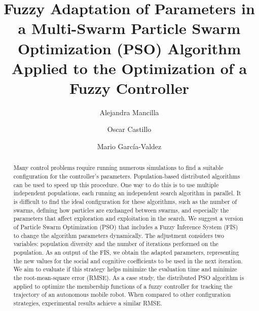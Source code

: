 \documentclass[runningheads]{llncs}
\begin{document}
%
\title{Fuzzy Adaptation of Parameters in a Multi-Swarm Particle Swarm Optimization (PSO) Algorithm Applied to the Optimization of a Fuzzy Controller } 

%
%
\author{Alejandra Mancilla \and
Oscar Castillo \and
Mario García-Valdez}
%
%

%
\maketitle              %
%
\begin{abstract}

     Many control problems require running numerous simulations to find a suitable configuration for the controller's parameters. Population-based distributed algorithms can be used to speed up this procedure. One way to do this is to use multiple independent populations, each running an independent search algorithm in parallel. It is difficult to find the ideal configuration for these algorithms, such as the number of swarms, defining how particles are exchanged between swarms, and especially the parameters that affect exploration and exploitation in the search. We suggest a version of Particle Swarm Optimization (PSO) that includes a Fuzzy Inference System (FIS) to change the algorithm parameters dynamically. The adjustment considers two variables: population diversity and the number of iterations performed on the population. As an output of the FIS, we obtain the adapted parameters, representing the new values for the social and cognitive coefficients to be used in the next iteration. We aim to evaluate if this strategy helps minimize the evaluation time and minimize the root-mean-square error (RMSE). As a case study, the distributed PSO algorithm is applied to optimize the membership functions of a fuzzy controller for tracking the trajectory of an autonomous mobile robot. When compared to other configuration strategies, experimental results achieve a similar RMSE.

\end{abstract}
%
%
\end{document}
